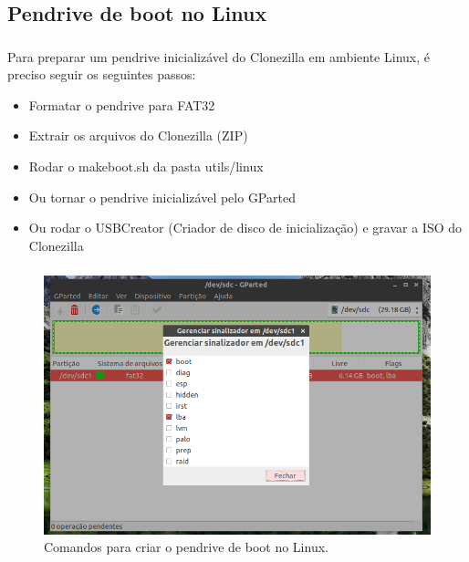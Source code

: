 \documentclass{beamer}
\begin{document}
\subsection{Pendrive de boot no Linux}
\begin{frame}
    \frametitle{\insertsection}
    \framesubtitle{\insertsubsection}
     \begin{block}{\insertsubsection }
    \justifying Para preparar um pendrive inicializável do Clonezilla em ambiente Linux, é preciso seguir os seguintes passos:
 
    \begin{itemize}[<+-| alert@+>]
        \item Formatar o pendrive para FAT32
        \item Extrair os arquivos do Clonezilla (ZIP)
        \item Rodar o makeboot.sh da pasta utils/linux
        \item Ou tornar o pendrive inicializável pelo GParted
        \item Ou rodar o USBCreator (Criador de disco de inicialização) e gravar a  ISO do Clonezilla
    \end{itemize}
    \end{block}
\end{frame}
\begin{frame}[plain,c]
    \frametitle{\insertsection}
    \framesubtitle{\insertsubsection}
    \begin{figure}
        \centering
        \includegraphics[scale=0.4]{images/pendrivebootavellinux.png}
        \caption{Comandos para criar o pendrive de boot no Linux.}
    \end{figure}  
\end{frame}
\end{document}
